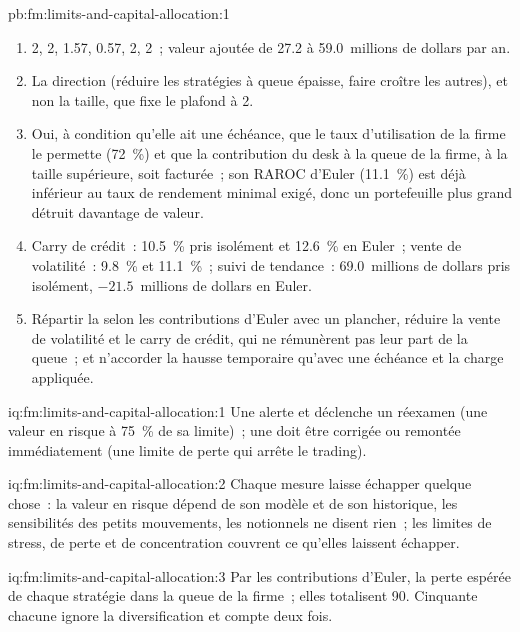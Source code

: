 \begin{solution}{pb:fm:limits-and-capital-allocation:1}
\begin{enumerate}
\item 2, 2, 1.57, 0.57, 2, 2~; valeur ajoutée de 27.2 à 59.0~millions de dollars par an.
\item La direction (réduire les stratégies à queue épaisse, faire croître les autres), et non la taille, que fixe le plafond à 2.
\item Oui, à condition qu'elle ait une échéance, que le taux d'utilisation de la firme le permette (72~\%) et que la contribution du desk à la queue de la firme, à la taille supérieure, soit facturée~;
son RAROC d'Euler (11.1~\%) est déjà inférieur au taux de rendement minimal exigé, donc un portefeuille plus grand détruit davantage de valeur.
\item Carry de crédit~: 10.5~\% pris isolément et 12.6~\% en Euler~; vente de volatilité~: 9.8~\% et 11.1~\%~; suivi de tendance~: 69.0~millions de dollars pris isolément, $-21.5$~millions de dollars en Euler.
\item Répartir la  selon les contributions d'Euler avec un plancher, réduire la vente de volatilité et le carry de crédit, qui ne rémunèrent pas leur part de la queue~;
et n'accorder la hausse temporaire qu'avec une échéance et la charge appliquée.
\end{enumerate}
\end{solution}

\begin{solution}{iq:fm:limits-and-capital-allocation:1}
Une  alerte et déclenche un réexamen (une valeur en risque à 75~\% de sa limite)~; une  doit être corrigée ou remontée immédiatement (une limite de perte qui arrête
le trading).
\end{solution}

\begin{solution}{iq:fm:limits-and-capital-allocation:2}
Chaque mesure laisse échapper quelque chose~: la valeur en risque dépend de son modèle et de son historique, les sensibilités des petits mouvements, les notionnels ne disent rien~; les limites de stress, de perte et
de concentration couvrent ce qu'elles laissent échapper.
\end{solution}

\begin{solution}{iq:fm:limits-and-capital-allocation:3}
Par les contributions d'Euler, la perte espérée de chaque stratégie dans la queue de la firme~; elles totalisent 90. Cinquante chacune ignore la diversification et compte deux fois.
\end{solution}

